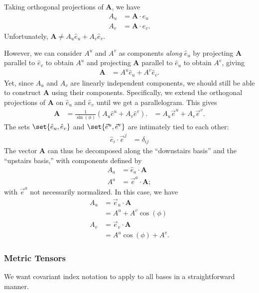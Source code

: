 \documentclass[10pt]{mypackage}
\begin{document}
  Taking orthogonal projections of $\mathbf{A}$, we have
  \begin{align*}
    A_u &= \mathbf{A}\cdot \hat{e}_u\\
    A_v &= \mathbf{A}\cdot \hat{e}_v.
  \end{align*}
  Unfortunately, $\mathbf{A}\neq A_u\hat{e}_u + A_v\hat{e}_v$.\newline

  However, we can consider $A^{u}$ and $A^{v}$ as components \textit{along} $\hat{e}_u$ by projecting $\mathbf{A}$ parallel to $\hat{e}_v$ to obtain $A^{u}$ and projecting $\mathbf{A}$ parallel to $\hat{e}_u$ to obtain $A^{v}$, giving
  \begin{align*}
    \mathbf{A} &= A^{u}\hat{e}_u + A^{v}\hat{e}_v.
  \end{align*}
  Yet, since $A_u$ and $A_v$ are linearly independent components, we should still be able to construct $\mathbf{A}$ using their components. Specifically, we extend the orthogonal projections of $\mathbf{A}$ on $\hat{e}_u$ and $\hat{e}_v$ until we get a parallelogram. This gives
  \begin{align*}
    \mathbf{A} &= \frac{1}{\sin\left( \phi \right)}\left( A_u\hat{e}^{u} + A_{v}\hat{e}^{v} \right).
               &=  A_u\vec{e}^{u} + A_v\vec{e}^{v}.
  \end{align*}
  The sets $\set{\hat{e}_u,\hat{e}_v}$ and $\set{\vec{e}^u,\vec{e}^v}$ are intimately tied to each other:
  \begin{align*}
    \hat{e}_i\cdot \vec{e}^j &= \delta_{ij}
  \end{align*}
  The vector $\mathbf{A}$ can thus be decomposed along the ``downstairs basis'' and the ``upstairs basis,'' with components defined by
  \begin{align*}
    A_{a} &= \hat{e}_a\cdot \mathbf{A}\\
    A^{a} &=\vec{e}^{a}\cdot \mathbf{A};
  \end{align*}
  with $\vec{e}^{a}$ not necessarily normalized. In this case, we have
  \begin{align*}
    A_u &= \vec{e}_u\cdot \mathbf{A}\\
        &= A^{u} + A^{v}\cos\left( \phi \right)\\
    A_{v} &= \vec{e}_v\cdot \mathbf{A}\\
          &= A^{u}\cos\left( \phi \right) + A^{v}.
  \end{align*}
  \subsubsection{Metric Tensors}%
  We want covariant index notation to apply to all bases in a straightforward manner.\newline
\end{document}
